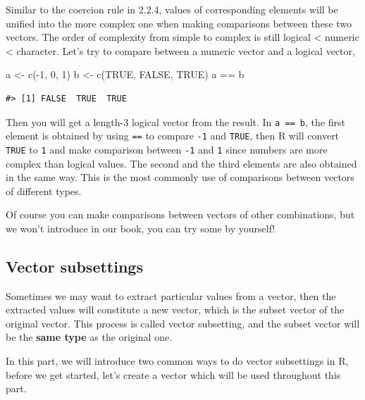 \documentclass[
]{book}
\newenvironment{Shaded}{\begin{snugshade}}{\end{snugshade}}
\newcommand{\ConstantTok}[1]{\textcolor[rgb]{0.00,0.00,0.00}{#1}}
\newcommand{\DecValTok}[1]{\textcolor[rgb]{0.00,0.00,0.81}{#1}}
\newcommand{\FunctionTok}[1]{\textcolor[rgb]{0.00,0.00,0.00}{#1}}
\newcommand{\NormalTok}[1]{#1}
\newcommand{\OtherTok}[1]{\textcolor[rgb]{0.56,0.35,0.01}{#1}}
\newcommand{\SpecialCharTok}[1]{\textcolor[rgb]{0.00,0.00,0.00}{#1}}
\begin{document}
Similar to the coercion rule in 2.2.4, values of corresponding elements will be unified into the more complex one when making comparisons between these two vectors. The order of complexity from simple to complex is still logical \textless{} numeric \textless{} character. Let's try to compare between a numeric vector and a logical vector,

\begin{Shaded}
\begin{Highlighting}[]
\NormalTok{a }\OtherTok{\textless{}{-}} \FunctionTok{c}\NormalTok{(}\SpecialCharTok{{-}}\DecValTok{1}\NormalTok{, }\DecValTok{0}\NormalTok{, }\DecValTok{1}\NormalTok{)}
\NormalTok{b }\OtherTok{\textless{}{-}} \FunctionTok{c}\NormalTok{(}\ConstantTok{TRUE}\NormalTok{, }\ConstantTok{FALSE}\NormalTok{, }\ConstantTok{TRUE}\NormalTok{)}
\NormalTok{a }\SpecialCharTok{==}\NormalTok{ b}
\end{Highlighting}
\end{Shaded}

\begin{verbatim}
#> [1] FALSE  TRUE  TRUE
\end{verbatim}

Then you will get a length-3 logical vector from the result. In \texttt{a\ ==\ b}, the first element is obtained by using \texttt{==} to compare \texttt{-1} and \texttt{TRUE}, then R will convert \texttt{TRUE} to \texttt{1} and make comparison between \texttt{-1} and \texttt{1} since numbers are more complex than logical values. The second and the third elements are also obtained in the same way. This is the most commonly use of comparisons between vectors of different types.

Of course you can make comparisons between vectors of other combinations, but we won't introduce in our book, you can try some by yourself!

\hypertarget{vector-subsettings}{%
\subsection{Vector subsettings}\label{vector-subsettings}}

Sometimes we may want to extract particular values from a vector, then the extracted values will constitute a new vector, which is the subset vector of the original vector. This process is called vector subsetting, and the subset vector will be the \textbf{same type} as the original one.

In this part, we will introduce two common ways to do vector subsettings in R, before we get started, let's create a vector which will be used throughout this part.
\end{document}
